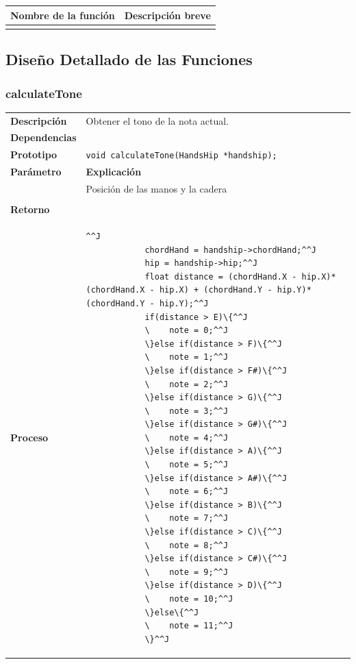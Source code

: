 \documentclass[a4paper,10pt]{article}
\begin{document}
\begin{tabular}{| p{30mm} | p{10cm} |}
        \hline
        \textbf{Nombre de la \mbox{función}} & \textbf{Descripción breve} \\
        \hline
         & \\
        \hline
\end{tabular}
\subsection{Diseño Detallado de las Funciones}
\subsubsection{calculateTone}
\begin{tabularx}{\textwidth}{p{25mm} X}
        \textbf{Descripción} & Obtener el tono de la nota actual. \\
        \textbf{Dependencias} & \\
        \textbf{Prototipo} & \lstinline{void calculateTone(HandsHip *handship);}\\
        \textbf{Parámetro} & \textbf{Explicación} \\
        \begin{tabular}{p{2cm} l}
                handsHip & Posición de las manos y la cadera \\
        \end{tabular}\\

        \textbf{Retorno} & \\
        \textbf{Proceso} & 
               \begin{lstlisting}^^J
            chordHand = handship->chordHand;^^J
            hip = handship->hip;^^J
            float distance = (chordHand.X - hip.X)*(chordHand.X - hip.X) + (chordHand.Y - hip.Y)*(chordHand.Y - hip.Y);^^J
            if(distance > E)\{^^J
            \    note = 0;^^J
            \}else if(distance > F)\{^^J
            \    note = 1;^^J
            \}else if(distance > F#)\{^^J
            \    note = 2;^^J
            \}else if(distance > G)\{^^J
            \    note = 3;^^J
            \}else if(distance > G#)\{^^J
            \    note = 4;^^J
            \}else if(distance > A)\{^^J
            \    note = 5;^^J
            \}else if(distance > A#)\{^^J
            \    note = 6;^^J
            \}else if(distance > B)\{^^J
            \    note = 7;^^J
            \}else if(distance > C)\{^^J
            \    note = 8;^^J
            \}else if(distance > C#)\{^^J
            \    note = 9;^^J
            \}else if(distance > D)\{^^J
            \    note = 10;^^J
            \}else\{^^J
            \    note = 11;^^J
            \}^^J
        \end{lstlisting} 
 \\
\end{tabularx}
\end{document}
